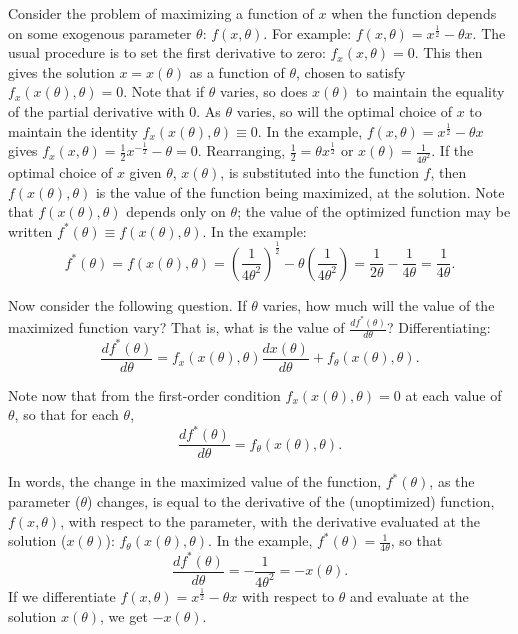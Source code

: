 \begin{original}
Consider the problem of maximizing a function of $x$ when the function depends on some exogenous parameter $\theta$: $f(x,\theta)$. For example: $f(x,\theta) = x^{\frac{1}{2}} - \theta x$. The usual procedure is to set the first derivative to zero: $f_x(x,\theta) = 0$. This then gives the solution $x = x(\theta)$ as a function of $\theta$, chosen to satisfy $f_x(x(\theta),\theta) = 0$. Note that if $\theta$ varies, so does $x(\theta)$ to maintain the equality of the partial derivative with 0. As $\theta$ varies, so will the optimal choice of $x$ to maintain the identity $f_x(x(\theta),\theta) \equiv 0$. In the example, $f(x,\theta) = x^{\frac{1}{2}} - \theta x$ gives $f_x(x,\theta) = \frac{1}{2}x^{-\frac{1}{2}} - \theta = 0$. Rearranging, $\frac{1}{2} = \theta x^{\frac{1}{2}}$ or $x(\theta) = \frac{1}{4\theta^2}$. If the optimal choice of $x$ given $\theta$, $x(\theta)$, is substituted into the function $f$, then $f(x(\theta),\theta)$ is the value of the function being maximized, at the solution. Note that $f(x(\theta),\theta)$ depends only on $\theta$; the value of the optimized function may be written $f^*(\theta) \equiv f(x(\theta),\theta)$. In the example:
\[
f^*(\theta) = f(x(\theta),\theta) = \left(\frac{1}{4\theta^2}\right)^{\frac{1}{2}} - \theta\left(\frac{1}{4\theta^2}\right) = \frac{1}{2\theta} - \frac{1}{4\theta} = \frac{1}{4\theta}.
\]

Now consider the following question. If $\theta$ varies, how much will the value of the maximized function vary? That is, what is the value of $\frac{df^*(\theta)}{d\theta}$? Differentiating:
\[
\frac{df^*(\theta)}{d\theta} = f_x(x(\theta),\theta)\frac{dx(\theta)}{d\theta} + f_\theta(x(\theta),\theta).
\]

Note now that from the first-order condition $f_x(x(\theta),\theta) = 0$ at each value of $\theta$, so that for each $\theta$,
\[
\frac{df^*(\theta)}{d\theta} = f_\theta(x(\theta),\theta).
\]

In words, the change in the maximized value of the function, $f^*(\theta)$, as the parameter ($\theta$) changes, is equal to the derivative of the (unoptimized) function, $f(x,\theta)$, with respect to the parameter, with the derivative evaluated at the solution ($x(\theta)$): $f_\theta(x(\theta),\theta)$. In the example, $f^*(\theta) = \frac{1}{4\theta}$, so that
\[
\frac{df^*(\theta)}{d\theta} = -\frac{1}{4\theta^2} = -x(\theta).
\]
If we differentiate $f(x,\theta) = x^{\frac{1}{2}} - \theta x$ with respect to $\theta$ and evaluate at the solution $x(\theta)$, we get $-x(\theta)$.
\end{original}
